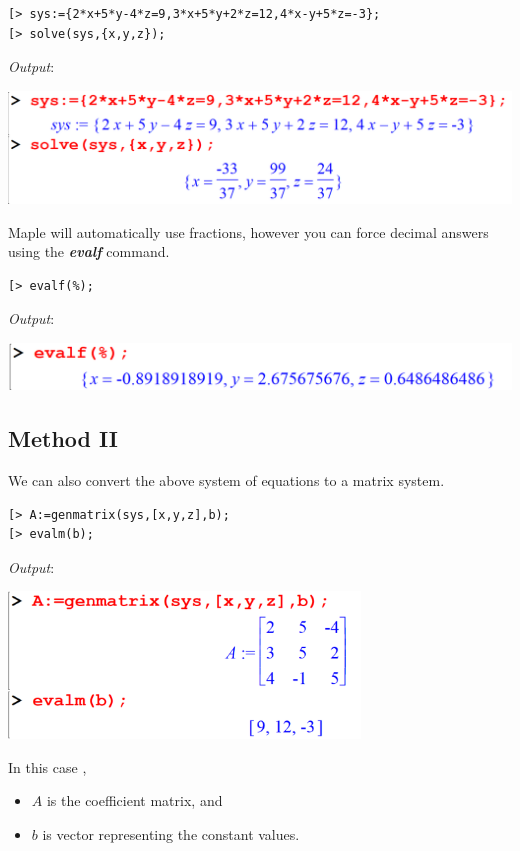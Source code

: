 \documentclass[
]{book}
\providecommand{\tightlist}{%
  \setlength{\itemsep}{0pt}\setlength{\parskip}{0pt}}
\theoremstyle{definition}
\theoremstyle{definition}
\theoremstyle{definition}
\theoremstyle{definition}
\theoremstyle{remark}
\begin{document}
\begin{verbatim}
[> sys:={2*x+5*y-4*z=9,3*x+5*y+2*z=12,4*x-y+5*z=-3};
[> solve(sys,{x,y,z});
\end{verbatim}

\emph{Output}:

\includegraphics{figures/Lesson 5/fig4.png}

Maple will automatically use fractions, however you can force decimal answers using the \textbf{\emph{evalf}} command.

\begin{verbatim}
[> evalf(%);
\end{verbatim}

\emph{Output}:

\includegraphics{figures/Lesson 5/fig5.png}

\subsection{Method II}\label{method-ii}

We can also convert the above system of equations to a matrix system.

\begin{verbatim}
[> A:=genmatrix(sys,[x,y,z],b);
[> evalm(b);
\end{verbatim}

\emph{Output}:

\includegraphics[width=0.7\textwidth,height=\textheight]{figures/Lesson 5/fig6.png}

In this case ,

\begin{itemize}
\tightlist
\item
  \(A\) is the coefficient matrix, and
\item
  \(b\) is vector representing the constant values.
\end{itemize}
\end{document}

